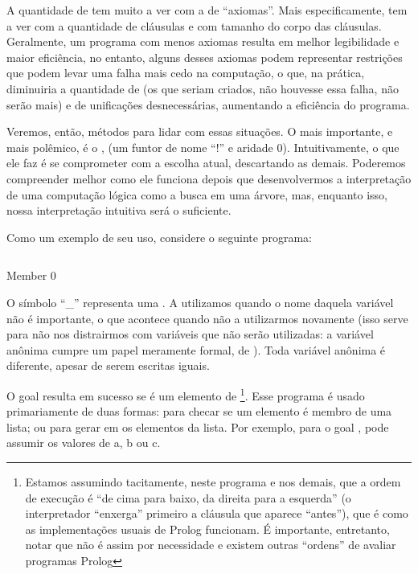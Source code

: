 A quantidade de  tem muito a ver com a de ``axiomas''. Mais especificamente, tem a ver com a quantidade de cláusulas e com tamanho do corpo das cláusulas. Geralmente, um programa com menos axiomas resulta em melhor legibilidade e maior eficiência, no entanto, alguns desses axiomas podem representar restrições que podem levar uma falha mais cedo na computação, o que, na prática, diminuiria a quantidade de  (os que seriam criados, não houvesse essa
falha, não serão mais) e de unificações
desnecessárias, aumentando a eficiência do programa.

Veremos, então, métodos para lidar com essas situações. O mais importante, e mais polêmico, é o
,  (um funtor de nome ``!'' e aridade 0). Intuitivamente, o que ele faz é se comprometer com a escolha atual, descartando as demais. Poderemos compreender melhor como ele funciona depois que desenvolvermos a interpretação de uma computação lógica como a busca em uma árvore, mas, enquanto isso, nossa interpretação intuitiva será o suficiente.

Como um exemplo de seu uso, considere o seguinte programa:

    \begin{listing}
\inputminted{prolog}{../Exemplos/Cap4/prog1_member.pl}
\caption{Member 0}
    \end{listing}

O símbolo ``\_'' representa uma . A utilizamos quando o nome daquela variável não é importante, o que acontece quando não a utilizarmos novamente (isso serve para não nos distrairmos com variáveis que não serão utilizadas: a variável anônima cumpre um papel meramente formal, de ). Toda variável anônima é diferente, apesar de serem
escritas iguais.

O goal  resulta em sucesso se  é um elemento de
\footnote{Estamos assumindo tacitamente, neste programa e nos demais, que a ordem de execução é ``de cima para baixo, da direita para a esquerda'' (o interpretador ``enxerga'' primeiro a cláusula que aparece ``antes''), que é como as implementações usuais de Prolog funcionam. É importante, entretanto, notar que não é assim por necessidade e existem outras ``ordens'' de avaliar programas Prolog}. Esse programa é usado primariamente de duas formas: para checar se um elemento é membro de
uma lista; ou para gerar em  os elementos da lista. Por exemplo, para o goal ,  pode assumir os valores de a, b ou c.

